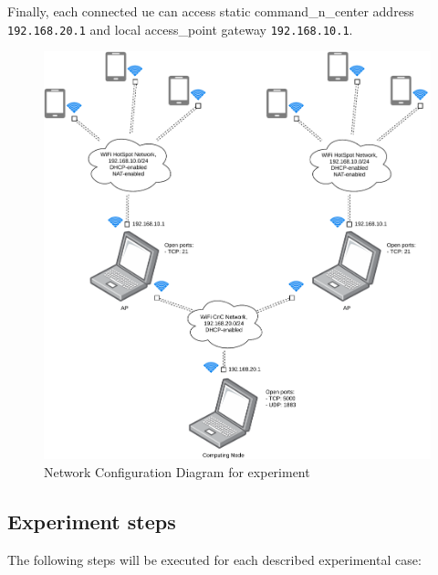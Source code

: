 Finally, each connected \gls{ue} can access static \gls{command_n_center} address \texttt{192.168.20.1}
and local \acrshort{access_point} gateway \texttt{192.168.10.1}.


\begin{figure}[H]
	\centering
	\includegraphics[width=\linewidth, keepaspectratio]{images/Deployment Diagram-Network_Diagram.pdf}
	\caption{Network Configuration Diagram for experiment}
	\label{fig:network-diagram}
\end{figure}

\subsection{Experiment steps}\label{experiment-steps}

The following steps will be executed for each described experimental
case:


